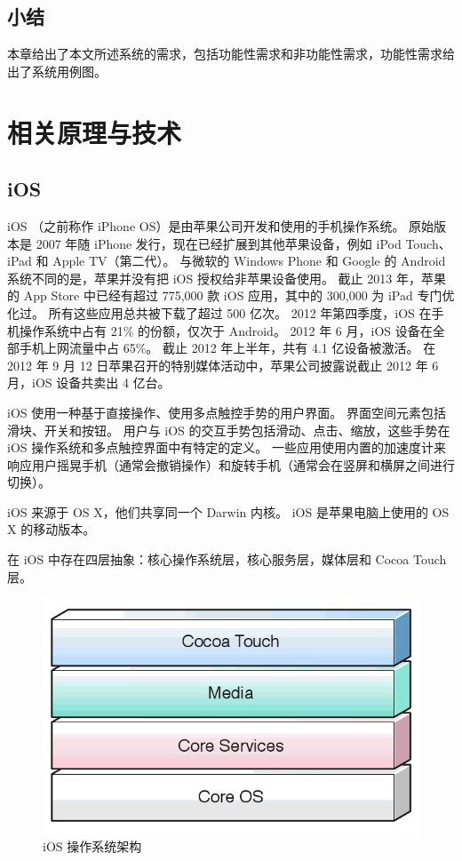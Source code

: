 \section{小结}

本章给出了本文所述系统的需求，包括功能性需求和非功能性需求，功能性需求给出了系统用例图。

\chapter{相关原理与技术}
\label{related-technologies}

\section{iOS}

iOS （之前称作 iPhone OS）是由苹果公司开发和使用的手机操作系统。
原始版本是 2007 年随 iPhone 发行，现在已经扩展到其他苹果设备，例如 iPod Touch、iPad 和 Apple TV（第二代）。
与微软的 Windows Phone 和 Google 的 Android 系统不同的是，苹果并没有把 iOS 授权给非苹果设备使用。
截止 2013 年，苹果的 App Store 中已经有超过 775,000 款 iOS 应用，其中的 300,000 为 iPad 专门优化过。
所有这些应用总共被下载了超过 500 亿次。
2012 年第四季度，iOS 在手机操作系统中占有 21\% 的份额，仅次于 Android。
2012 年 6 月，iOS 设备在全部手机上网流量中占 65\%。
截止 2012 年上半年，共有 4.1 亿设备被激活。
在 2012 年 9 月 12 日苹果召开的特别媒体活动中，苹果公司披露说截止 2012 年 6 月，iOS 设备共卖出 4 亿台。

iOS 使用一种基于直接操作、使用多点触控手势的用户界面。
界面空间元素包括滑块、开关和按钮。
用户与 iOS 的交互手势包括滑动、点击、缩放，这些手势在 iOS 操作系统和多点触控界面中有特定的定义。
一些应用使用内置的加速度计来响应用户摇晃手机（通常会撤销操作）和旋转手机（通常会在竖屏和横屏之间进行切换）。

iOS 来源于 OS X，他们共享同一个 Darwin 内核。
iOS 是苹果电脑上使用的 OS X 的移动版本。

在 iOS 中存在四层抽象：核心操作系统层，核心服务层，媒体层和 Cocoa Touch 层。

\begin{figure}[h!]
    \centering
    \includegraphics[width=400pt]{figure/iOS.png}
    \caption{iOS 操作系统架构}
    \label{ios}
\end{figure}

